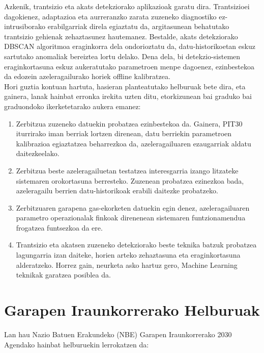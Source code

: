 \documentclass[12pt]{article}
\numberwithin{figure}{section}
\numberwithin{equation}{section}
\begin{document}
Azkenik, trantsizio eta akats detekziorako aplikazioak garatu dira. Trantsizioei dagokienez, adaptazioa eta aurreranzko zarata zuzeneko diagnostiko ez\hyp{}intrusiborako erabilgarriak direla egiaztatu da, argitasunean behatutako trantsizio gehienak zehaztasunez hautemanez. Bestalde, akats detekziorako DBSCAN algoritmoa eraginkorra dela ondorioztatu da, datu-historikoetan eskuz sartutako anomaliak bereiztea lortu delako. Dena dela, bi detekzio-sistemen eraginkortasuna eskuz aukeratutako parametroen menpe dagoenez, ezinbestekoa da edozein azeleragailurako horiek offline kalibratzea.\\

Hori guztia kontuan hartuta, hasieran planteatutako helburuak bete dira, eta gainera, lanak hainbat erronka irekita uzten ditu, etorkizunean bai graduko bai graduondoko
ikerketetarako aukera emanez:

\begin{enumerate}
    \item Zerbitzua zuzeneko datuekin probatzea ezinbestekoa da. Gainera, PIT30 iturrirako iman berriak lortzen direnean, datu berriekin parametroen kalibrazioa egiaztatzea beharrezkoa da, azeleragailuaren ezaugarriak aldatu daitezkeelako.
    \item Zerbitzua beste azeleragailuetan testatzea interesgarria izango litzateke sistemaren orokortasuna berresteko. Zuzenean probatzea ezinezkoa bada, azeleragailu berrien datu-historikoak erabili daitezke probatzeko.
    \item Zerbitzuaren garapena gas-ekorketen datuekin egin denez, azeleragailuaren parametro operazionalak finkoak direnenean sistemaren funtzionamendua frogatzea funtsezkoa da ere.
    \item Trantsizio eta akatsen zuzeneko detekziorako beste teknika batzuk probatzea lagungarria izan daiteke, horien arteko zehaztasuna eta eraginkortasuna alderatzeko. Horrez gain, neurketa asko hartuz gero, Machine Learning teknikak garatzea posiblea da.
\end{enumerate}
\newpage
\section{Garapen Iraunkorrerako Helburuak}
Lan hau Nazio Batuen Erakundeko (NBE) Garapen Iraunkorrerako 2030 Agendako hainbat helburuekin lerrokatzen da:\\
\end{document}
